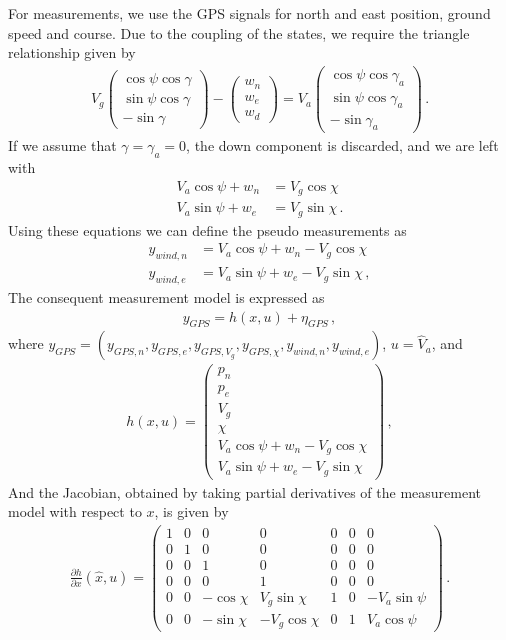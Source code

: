 For measurements, we use the GPS signals for north and east position, ground speed and course. Due to the coupling of the states, we require the triangle relationship given by
\begin{align*}
V_g \begin{pmatrix}
\cos\psi\cos\gamma \\
\sin\psi\cos\gamma \\
-\sin\gamma
\end{pmatrix}
-
\begin{pmatrix}
w_n \\
w_e \\
w_d
\end{pmatrix}
=V_a
\begin{pmatrix}
\cos\psi\cos\gamma_a \\
\sin\psi\cos\gamma_a \\
-\sin\gamma_a
\end{pmatrix}\,.
\end{align*} 
If we assume that $\gamma=\gamma_a=0$, the down component is discarded, and we are left with
\begin{align*}
V_a\cos\psi+w_n&=V_g\cos\chi \\
V_a\sin\psi+w_e&=V_g\sin\chi\,.
\end{align*}
Using these equations we can define the pseudo measurements as
\begin{align*}
y_{wind,n} &= V_a\cos\psi+w_n-V_g\cos\chi \\
y_{wind,e} &= V_a\sin\psi+w_e-V_g\sin\chi\,,
\end{align*}
The consequent measurement model is expressed as
\begin{align*}
y_{GPS}=h(x,u)+\eta_{GPS}\,,
\end{align*}
where $y_{GPS}=(y_{GPS,n},y_{GPS,e},y_{GPS,V_g},y_{GPS,\chi},y_{wind,n},y_{wind,e})$, $u=\hat{V}_a$, and
\begin{align}
h(x,u)=
\begin{pmatrix}
p_n \\
p_e \\
V_g \\
\chi \\
V_a\cos\psi+w_n-V_g\cos\chi \\
V_a\sin\psi+w_e-V_g\sin\chi
\end{pmatrix}\,,
\end{align}
And the Jacobian, obtained by taking partial derivatives of the measurement model with respect to $x$, is given by
\begin{align}
\frac{\partial h}{\partial x}(\hat{x},u)=
\begin{pmatrix}
1 & 0 & 0 & 0 & 0 & 0 & 0 \\
0 & 1 & 0 & 0 & 0 & 0 & 0 \\
0 & 0 & 1 & 0 & 0 & 0 & 0 \\
0 & 0 & 0 & 1 & 0 & 0 & 0 \\
0 & 0 & -\cos\chi & V_g\sin\chi & 1 & 0 & -V_a\sin\psi \\
0 & 0 & -\sin\chi & -V_g\cos\chi & 0 & 1 & V_a\cos\psi
\end{pmatrix}\,.
\end{align}
